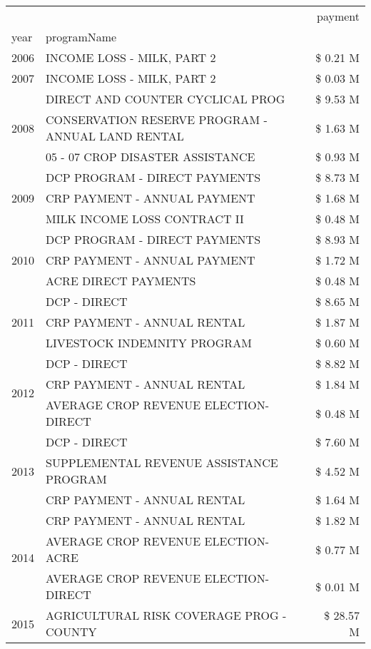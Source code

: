 \begin{tabular}{llr}
\toprule
 &  & payment \\
year & programName &  \\
\midrule
2006 & INCOME LOSS - MILK, PART 2 & \$ 0.21 M \\
\cline{1-3}
2007 & INCOME LOSS - MILK, PART 2 & \$ 0.03 M \\
\cline{1-3}
\multirow[t]{3}{*}{2008} & DIRECT AND COUNTER CYCLICAL PROG & \$ 9.53 M \\
 & CONSERVATION RESERVE PROGRAM - ANNUAL LAND RENTAL & \$ 1.63 M \\
 & 05 - 07 CROP DISASTER ASSISTANCE & \$ 0.93 M \\
\cline{1-3}
\multirow[t]{3}{*}{2009} & DCP PROGRAM - DIRECT PAYMENTS & \$ 8.73 M \\
 & CRP PAYMENT - ANNUAL PAYMENT & \$ 1.68 M \\
 & MILK INCOME LOSS CONTRACT II & \$ 0.48 M \\
\cline{1-3}
\multirow[t]{3}{*}{2010} & DCP PROGRAM - DIRECT PAYMENTS & \$ 8.93 M \\
 & CRP PAYMENT - ANNUAL PAYMENT & \$ 1.72 M \\
 & ACRE DIRECT PAYMENTS & \$ 0.48 M \\
\cline{1-3}
\multirow[t]{3}{*}{2011} & DCP - DIRECT & \$ 8.65 M \\
 & CRP PAYMENT - ANNUAL RENTAL & \$ 1.87 M \\
 & LIVESTOCK INDEMNITY PROGRAM & \$ 0.60 M \\
\cline{1-3}
\multirow[t]{3}{*}{2012} & DCP - DIRECT & \$ 8.82 M \\
 & CRP PAYMENT - ANNUAL RENTAL & \$ 1.84 M \\
 & AVERAGE CROP REVENUE ELECTION-DIRECT & \$ 0.48 M \\
\cline{1-3}
\multirow[t]{3}{*}{2013} & DCP - DIRECT & \$ 7.60 M \\
 & SUPPLEMENTAL REVENUE ASSISTANCE PROGRAM & \$ 4.52 M \\
 & CRP PAYMENT - ANNUAL RENTAL & \$ 1.64 M \\
\cline{1-3}
\multirow[t]{3}{*}{2014} & CRP PAYMENT - ANNUAL RENTAL & \$ 1.82 M \\
 & AVERAGE CROP REVENUE ELECTION-ACRE & \$ 0.77 M \\
 & AVERAGE CROP REVENUE ELECTION-DIRECT & \$ 0.01 M \\
\cline{1-3}
\multirow[t]{3}{*}{2015} & AGRICULTURAL RISK COVERAGE PROG - COUNTY & \$ 28.57 M \\

\end{tabular}
